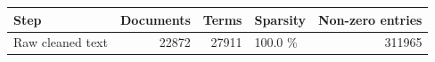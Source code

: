 \begin{tabular}{lrrlr}
\toprule
Step & Documents & Terms & Sparsity & Non-zero entries \\
\midrule
Raw cleaned text & 22872 & 27911 & 100.0 \% & 311965 \\
\bottomrule
\end{tabular}
